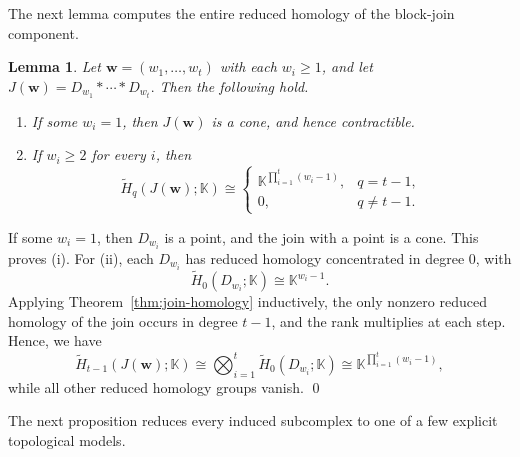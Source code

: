 \documentclass[12pt]{article}
\renewenvironment{proof}{{\bf \noindent Proof.}}{\qed}
\newtheorem{lemma}[theorem]{Lemma}
\theoremstyle{definition}
\theoremstyle{remark}
\newcommand{\kk}{\mathbb{K}}
\newcommand{\bk}[1]{\mathbf{#1}}
\newcommand{\wt}{\widetilde}
\begin{document}
	 \medskip The next lemma computes the entire reduced homology of the block-join component.
	
	\begin{lemma}\label{lem:block-homology}
		Let $\bk{w}=(w_1,\dots,w_t)$ with each $w_i\geq 1$, and let
		$ J(\bk{w})=D_{w_1} * \cdots * D_{w_t}. $
		Then the following hold.
		
		\begin{enumerate}[label=\textup{(\roman*)},noitemsep]
			\item If some $w_i=1$, then $J(\bk{w})$ is a cone, and hence contractible.
			\item If $w_i\geq 2$ for every $i$, then
			$$
			\wt H_q(J(\bk{w});\kk)\cong
			\begin{cases}
				\kk^{\prod_{i=1}^t (w_i-1)}, & q=t-1,\\
				0, & q\neq t-1.
			\end{cases}
			$$
		\end{enumerate}
	\end{lemma}
	
	\begin{proof}
		If some $w_i=1$, then $D_{w_i}$ is a point, and the join with a point is a cone. This proves (i).
		 For (ii), each $D_{w_i}$ has reduced homology concentrated in degree $0$, with
		$$
		\wt H_0(D_{w_i};\kk)\cong \kk^{w_i-1}.
		$$
		Applying Theorem~\ref{thm:join-homology} inductively, the only nonzero reduced homology of the join occurs in degree $t-1$, and the rank multiplies at each step. Hence, we have
		$$
		\wt H_{t-1}(J(\bk{w});\kk)\cong \bigotimes_{i=1}^t \wt H_0(D_{w_i};\kk)\cong \kk^{\prod_{i=1}^t (w_i-1)},
		$$
		while all other reduced homology groups vanish.
	\end{proof}
	
	 \medskip The next proposition reduces every induced subcomplex to one of a few explicit topological models.
	
\end{document}
